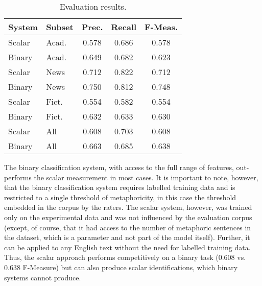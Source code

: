 \documentclass[11pt]{article}
\begin{document}
\begin{table}[h]
\begin{center}
\begin{tabular}{|l|l|c|c|c|}
\hline \bf System & \bf Subset & \bf Prec. & \bf Recall & \bf F-Meas. \\ \hline
Scalar & Acad. & 0.578 & 0.686 & 0.578 \\
Binary & Acad. & 0.649 & 0.682 & 0.623 \\
Scalar & News & 0.712 & 0.822 & 0.712 \\
Binary & News & 0.750 & 0.812 & 0.748 \\
Scalar & Fict. & 0.554 & 0.582 & 0.554 \\
Binary & Fict. & 0.632 & 0.633 & 0.630 \\
Scalar & All & 0.608 & 0.703 & 0.608 \\
Binary & All & 0.663 & 0.685 & 0.638 \\
\hline
\end{tabular}
\end{center}
\caption{\label{font-table} Evaluation results. }
\end{table}


The binary classification system, with access to the full range of features, out-performs the scalar measurement in most cases. It is important to note, however, that the binary classification system requires labelled training data and is restricted to a single threshold of metaphoricity, in this case the threshold embedded in the corpus by the raters. The scalar system, however, was trained only on the experimental data and was not influenced by the evaluation corpus (except, of course, that it had access to the number of metaphoric sentences in the dataset, which is a parameter and not part of the model itself). Further, it can be applied to any English text without the need for labelled training data. Thus, the scalar approach performs competitively on a binary task (0.608 vs. 0.638 F-Measure) but can also produce scalar identifications, which binary systems cannot produce.


%
%
\end{document}
